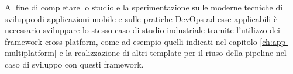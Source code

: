 Al fine di completare lo studio e la sperimentazione sulle moderne tecniche di sviluppo di applicazioni mobile e sulle pratiche DevOps ad esse applicabili è necessario sviluppare lo stesso caso di studio industriale tramite l'utilizzo dei framework cross-platform, 
come ad esempio quelli indicati nel capitolo \ref{ch:app-multiplatform} e la realizzazione di altri template per il riuso della pipeline nel caso di sviluppo con questi framework.

